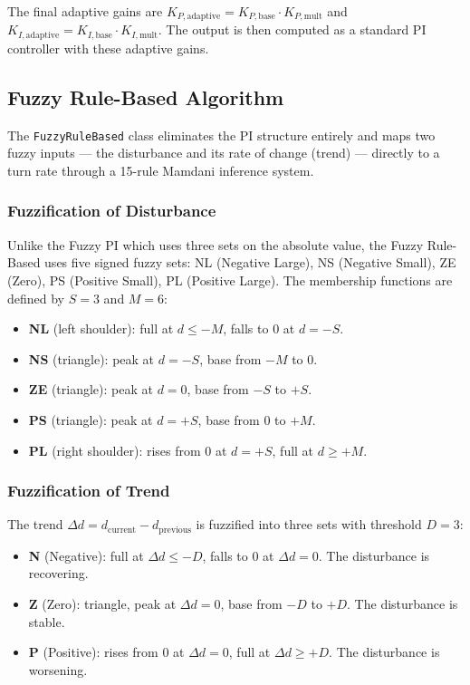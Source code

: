The final adaptive gains are $K_{P,\text{adaptive}} = K_{P,\text{base}} \cdot K_{P,\text{mult}}$ and $K_{I,\text{adaptive}} = K_{I,\text{base}} \cdot K_{I,\text{mult}}$. The output is then computed as a standard PI controller with these adaptive gains.


\subsection{Fuzzy Rule-Based Algorithm}
\label{sec:fuzzy-rb}

The \texttt{FuzzyRuleBased} class eliminates the PI structure entirely and maps two fuzzy inputs — the disturbance and its rate of change (trend) — directly to a turn rate through a 15-rule Mamdani inference system.

\subsubsection{Fuzzification of Disturbance}

Unlike the Fuzzy PI which uses three sets on the absolute value, the Fuzzy Rule-Based uses five signed fuzzy sets: NL (Negative Large), NS (Negative Small), ZE (Zero), PS (Positive Small), PL (Positive Large). The membership functions are defined by $S = 3$ and $M = 6$:

\begin{itemize}
    \item \textbf{NL} (left shoulder): full at $d \le -M$, falls to 0 at $d = -S$.
    \item \textbf{NS} (triangle): peak at $d = -S$, base from $-M$ to $0$.
    \item \textbf{ZE} (triangle): peak at $d = 0$, base from $-S$ to $+S$.
    \item \textbf{PS} (triangle): peak at $d = +S$, base from $0$ to $+M$.
    \item \textbf{PL} (right shoulder): rises from 0 at $d = +S$, full at $d \ge +M$.
\end{itemize}

\subsubsection{Fuzzification of Trend}

The trend $\Delta d = d_{\text{current}} - d_{\text{previous}}$ is fuzzified into three sets with threshold $D = 3$:

\begin{itemize}
    \item \textbf{N} (Negative): full at $\Delta d \le -D$, falls to 0 at $\Delta d = 0$. The disturbance is recovering.
    \item \textbf{Z} (Zero): triangle, peak at $\Delta d = 0$, base from $-D$ to $+D$. The disturbance is stable.
    \item \textbf{P} (Positive): rises from 0 at $\Delta d = 0$, full at $\Delta d \ge +D$. The disturbance is worsening.
\end{itemize}

